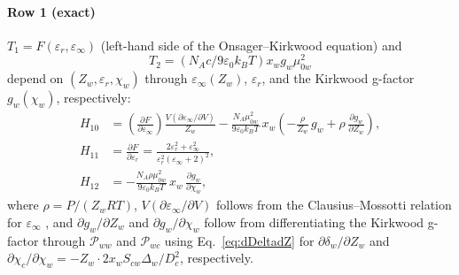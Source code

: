\documentclass[preprint,12pt,authoryear]{elsarticle}
\begin{document}
\paragraph{Row 1 (exact)}
$T_1 = F(\varepsilon_r,\varepsilon_\infty)$ (left-hand side of the Onsager--Kirkwood
equation) and $$T_2 = (N_Ac/9\varepsilon_0k_BT)x_w g_w\mu_{0w}^2$$ depend on
$(Z_w,\varepsilon_r,\chi_w)$ through $\varepsilon_\infty(Z_w)$, $\varepsilon_r$,
and the Kirkwood g-factor $g_w(\chi_w)$, respectively:
\begin{align}
  H_{10} &= \left(\frac{\partial F}{\partial\varepsilon_\infty}\right)
             \frac{V(\partial\varepsilon_\infty/\partial V)}{Z_w}
           - \frac{N_A\mu_{0w}^2}{9\varepsilon_0 k_BT}\,x_w
             \left(-\frac{\rho}{Z_w}\,g_w
                   + \rho\,\frac{\partial g_w}{\partial Z_w}\right),
             \label{eq:H10} \\
  H_{11} &= \frac{\partial F}{\partial\varepsilon_r}
           = \frac{2\varepsilon_r^2+\varepsilon_\infty^2}
                  {\varepsilon_r^2(\varepsilon_\infty+2)^2},
             \label{eq:H11} \\
  H_{12} &= -\frac{N_A\rho\mu_{0w}^2}{9\varepsilon_0 k_BT}\,x_w\,
              \frac{\partial g_w}{\partial\chi_w},
             \label{eq:H12}
\end{align}
where $\rho = P/(Z_wRT)$, $V(\partial\varepsilon_\infty/\partial V)$ follows
from the Clausius--Mossotti relation for $\varepsilon_\infty$ \citep{Coelho2025},
and $\partial g_w/\partial Z_w$ and $\partial g_w/\partial\chi_w$ follow from
differentiating the Kirkwood g-factor \citep{Coelho2025} through
$\mathcal{P}_{ww}$ and $\mathcal{P}_{wc}$
using Eq.~\eqref{eq:dDeltadZ} for $\partial\delta_w/\partial Z_w$ and
$\partial\chi_c/\partial\chi_w = -Z_w\cdot 2x_wS_{cw}\Delta_w/D_c^2$,
respectively.
\end{document}
